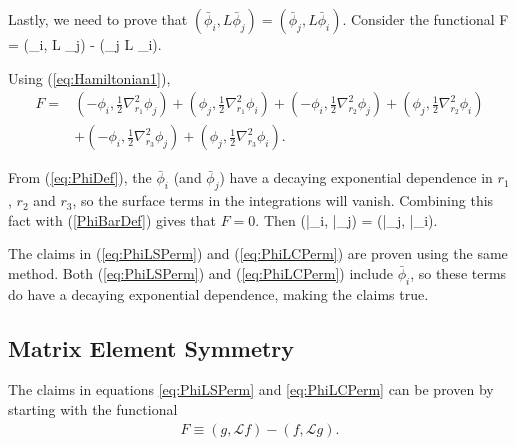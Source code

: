 \documentclass[Dissertation.tex]{subfiles}
\begin{document}
Lastly, we need to prove that $\left(\bar{\phi}_i, L \bar{\phi}_j\right) = \left(\bar{\phi}_j, L \bar{\phi}_i\right)$.  Consider the functional
\beq
F = (\phi_i, L \phi_j) - (\phi_j L \phi_i).
\eeq

Using (\ref{eq:Hamiltonian1}),
\begin{align}
	F=&\left({-\phi_i,{\frac {1}{2}{\nabla }_{{r}_{1}}^{2}\phi_j}}\right)+\left({\phi_j,{\frac {1}{2}{\nabla }_{{r}_{1}}^{2}\phi_i}}\right)+
	\left({-\phi_i,{\frac {1}{2}{\nabla }_{{r}_{2}}^{2}\phi_j}}\right)+\left({\phi_j,{\frac {1}{2}{\nabla }_{{r}_{2}}^{2}\phi_i}}\right) \nonumber \\
	&+\left({-\phi_i,{\frac {1}{2}{\nabla }_{{r}_{3}}^{2}\phi_j}}\right)+\left({\phi_j,{\frac {1}{2}{\nabla }_{{r}_{3}}^{2}\phi_i}}\right).
\end{align}

From (\ref{eq:PhiDef}), the $\bar{\phi}_i$ (and $\bar{\phi}_j$) have a decaying exponential dependence in $r_1$, $r_2$ and $r_3$, so the surface terms in the integrations will vanish.  Combining this fact with (\ref{PhiBarDef}) gives that $F = 0$.  Then
\beq
\left(\bar{\phi}_i,  \bar{\phi}_j\right) = \left(\bar{\phi}_j,  \bar{\phi}_i\right).
\label{PhiLPhiPerm}
\eeq

The claims in (\ref{eq:PhiLSPerm}) and (\ref{eq:PhiLCPerm}) are proven using the same method.  Both (\ref{eq:PhiLSPerm}) and (\ref{eq:PhiLCPerm}) include $\bar{\phi}_i$, so these terms do have a decaying exponential dependence, making the claims true.



\subsection{Matrix Element Symmetry}
The claims in equations \ref{eq:PhiLSPerm} and \ref{eq:PhiLCPerm} can be proven by starting with the functional
\begin{align}
	F \equiv \left(g,\mathcal{L}f \right)-\left(f,\mathcal{L}g \right).
\end{align}
\end{document}

